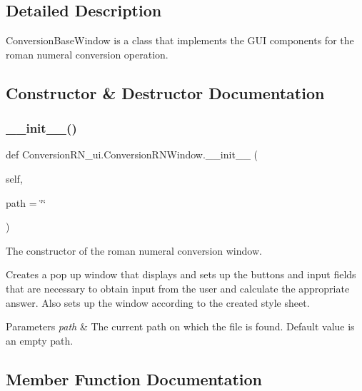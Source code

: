 \subsection{Detailed Description}
Conversion\+Base\+Window is a class that implements the G\+UI components for the roman numeral conversion operation. 

\subsection{Constructor \& Destructor Documentation}
\mbox{\label{class_conversion_r_n__ui_1_1_conversion_r_n_window_aa4752dfe8364faa4649c2c19ff55fba6}} 
\subsubsection{\texorpdfstring{\+\_\+\+\_\+init\+\_\+\+\_\+()}{\_\_init\_\_()}}
{\footnotesize\ttfamily def Conversion\+R\+N\+\_\+ui.\+Conversion\+R\+N\+Window.\+\_\+\+\_\+init\+\_\+\+\_\+ (\begin{DoxyParamCaption}\item[{}]{self,  }\item[{}]{path = {\ttfamily \char`\"{}\char`\"{}} }\end{DoxyParamCaption})}



The constructor of the roman numeral conversion window. 

Creates a pop up window that displays and sets up the buttons and input fields that are necessary to obtain input from the user and calculate the appropriate answer. Also sets up the window according to the created style sheet. 
\begin{DoxyParams}{Parameters}
{\em path} & The current path on which the file is found. Default value is an empty path. \\
\hline
\end{DoxyParams}


\subsection{Member Function Documentation}
\mbox{\label{class_conversion_r_n__ui_1_1_conversion_r_n_window_a0c015e92809a27ecde70f4b62e102da4}} 
